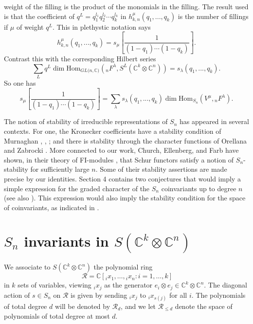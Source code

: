 \documentclass[12pt]{article}%
\begin{document}
weight of the filling is the product of the monomials in the filling. The
result used is that the coefficient of $q^{L}=q_{1}^{l_{1}}q_{2}^{l_{2}}\cdots
q_{k}^{l_{k}}$ in $h_{k,n}^{\mu}(q_{1},...,q_{k})$ is the number of fillings
if $\mu$ of weight $q^{L}$. This in plethystic notation says
\[
h_{k,n}^{\mu}(q_{1},...,q_{k})=s_{\mu}\left[  \frac{1}{(1-q_{1})\cdots
(1-q_{k})}\right]  .
\]
Contrast this with the corresponding Hilbert series
\[
\sum_{L}q^{L}\dim\mathrm{Hom}_{GL(n,\mathbb{C)}}({}_{n}F^{\lambda}%
,S^{L}(\mathbb{C}^{k}\otimes\mathbb{C}^{n}))=s_{\lambda}(q_{1},...,q_{k}).
\]
So one has%
\[
s_{\mu}\left[  \frac{1}{(1-q_{1})\cdots(1-q_{k})}\right]  =\sum_{\lambda
}s_{\lambda}(q_{1},...,q_{k})\dim\mathrm{Hom}_{S_{n}}(V^{\mu},{}_{n}%
F^{\lambda}).
\]
\newline

The notion of stability of irreducible representations of $S_{n}$ has appeared
in several contexts. For one, the Kronecker coefficients have a stability
condition of Murnaghan \cite{Mur38}, \cite{Mur55}, \cite{KroneckerStability};
and there is stability through the character functions of Orellana and
Zabrocki \cite{OrellanaZabrocki}. More connected to our work,
Church, Ellenberg, and Farb have shown, in their theory of FI-modules
\cite{FImodules}, that Schur functors satisfy a notion of $S_{n}$-stability
for sufficiently large $n$. Some of their stability assertions are made
precise by our identities. Section 4 contains two conjectures that would imply
a simple expression for the graded character of the $S_{n}$ coinvariants up to
degree $n$ (see also \cite{Bergeron}). This expression would also imply the
stability condition for the space of coinvariants, as indicated in \cite{FImodules}.

\section{$S_{n}$ invariants in $S(\mathbb{C}^{k}\otimes\mathbb{C}^{n})$}

We associate to $S(\mathbb{C}^{k}\otimes\mathbb{C}^{n})$ the polynomial ring
\[
\ \mathcal{R} = \mathbb{C}[ {}_{i}x_{1},\dots, {}_{i}x_{n}: i=1,\dots, k ]
\]
in $k$ sets of variables, viewing ${}_{i} x_{j} $ as the generator $e_{i}
\otimes e_{j} \in\mathbb{C}^{k}\otimes\mathbb{C}^{n}.$ The diagonal action of
$s\in S_{n}$ on $\mathcal{R}$ is given by sending ${}_{i}x_{j}$ to ${}%
_{i}x_{s(j)}$ for all $i$. The polynomials of total degree $d$ will be denoted
by $\mathcal{R}_{d}$, and we let $\mathcal{R}_{\leq d}$ denote the space of
polynomials of total degree at most $d$.
\end{document}
